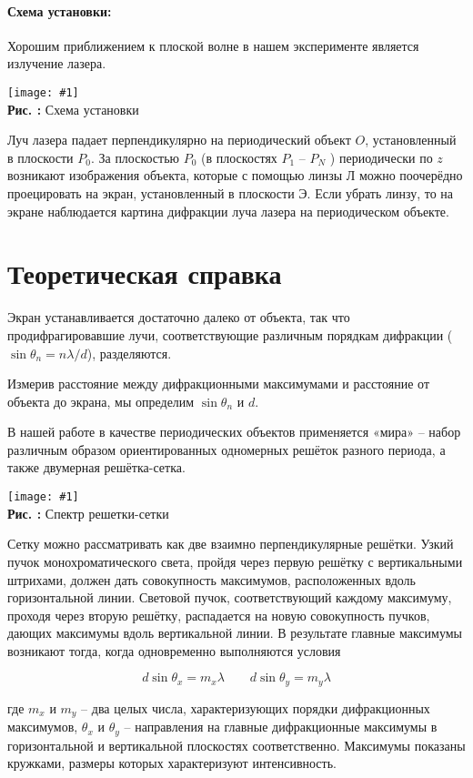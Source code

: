 \documentclass[12pt,a4paper]{article}
\newcounter{picture}
\newcommand{\embed}[3]{\begin{center}
		\texttt{[image: \#1]}
		\\\textbf{Рис. \thepicture:} #3
		\label{pic_\thepicture}
		\addtocounter{picture}{1}
\end{center}}
\begin{document}
	\paragraph*{Схема установки:} \hfill
	
	Хорошим приближением к плоской волне в нашем эксперименте является излучение лазера.
	
	\embed{PIC_1.png}{0.3}{Схема установки}
	
	Луч лазера падает перпендикулярно на периодический объект $O$, установленный в	плоскости $P_0$.
	За плоскостью $P_0$ (в плоскостях $P_1$ -- $P_N$  ) периодически по $z$ возникают изображения объекта, которые с помощью линзы Л можно поочерёдно проецировать на экран, установленный в плоскости Э. Если убрать линзу, то на экране наблюдается картина дифракции луча лазера на периодическом объекте.
	
	\section{Теоретическая справка}
	
	Экран устанавливается достаточно далеко от объекта, так что продифрагировавшие лучи, соответствующие различным порядкам дифракции ($\sin \theta_n = n\lambda/d$), разделяются.
	
	Измерив расстояние между дифракционными максимумами и расстояние от объекта до экрана, мы определим $\sin \theta_n$ и $d$.
	
	В нашей работе в качестве периодических объектов применяется «мира» -- набор различным образом ориентированных одномерных решёток разного периода, а также	двумерная решётка-сетка.
	
	\embed{PIC_2.png}{0.3}{Спектр решетки-сетки}
	
	Сетку можно рассматривать как две взаимно перпендикулярные решётки. Узкий пучок монохроматического света, пройдя через первую решётку с вертикальными штрихами, должен дать совокупность максимумов, расположенных вдоль горизонтальной линии. Световой пучок, соответствующий каждому максимуму, проходя через вторую решётку, распадается на новую совокупность пучков, дающих максимумы вдоль вертикальной линии. В результате главные максимумы возникают тогда, когда одновременно выполняются условия
	
	$$d \sin \theta_x = m_x \lambda \ \ \ \ \ \ \ \ \ d \sin \theta_y = m_y \lambda$$
	
	где $m_x$ и $m_y$ -- два целых числа, характеризующих порядки дифракционных максимумов, $\theta_x$ и $\theta_y$ -- направления на главные дифракционные максимумы в горизонтальной и вертикальной плоскостях соответственно. Максимумы показаны кружками, размеры которых характеризуют интенсивность.
	
\end{document}
